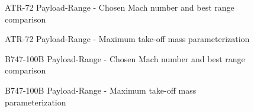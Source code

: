 %
\begin{figure}[!h]
\centering

\caption{ATR-72 Payload-Range - Chosen Mach number and best range comparison}
\end{figure}
%
\begin{figure}[!h]
\centering

\caption{ATR-72 Payload-Range - Maximum take-off mass parameterization}
\end{figure}
%
\begin{figure}[!h]
\centering

\caption{B747-100B Payload-Range - Chosen Mach number and best range comparison}
\end{figure}
%
\begin{figure}[!h]
\centering

\caption{B747-100B Payload-Range - Maximum take-off mass parameterization}
\end{figure}